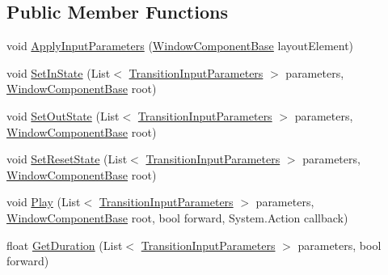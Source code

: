 \subsection*{Public Member Functions}
\begin{DoxyCompactItemize}
\item 
void \hyperlink{class_unity_engine_1_1_u_i_1_1_windows_1_1_animations_1_1_window_animation_base_a5a1b0d698fe0afa0c70ef1b9adcc5501}{Apply\+Input\+Parameters} (\hyperlink{class_unity_engine_1_1_u_i_1_1_windows_1_1_window_component_base}{Window\+Component\+Base} layout\+Element)
\item 
void \hyperlink{class_unity_engine_1_1_u_i_1_1_windows_1_1_animations_1_1_window_animation_base_ad9f07ee171d3b7f3b4be453d116838c6}{Set\+In\+State} (List$<$ \hyperlink{class_unity_engine_1_1_u_i_1_1_windows_1_1_animations_1_1_transition_input_parameters}{Transition\+Input\+Parameters} $>$ parameters, \hyperlink{class_unity_engine_1_1_u_i_1_1_windows_1_1_window_component_base}{Window\+Component\+Base} root)
\item 
void \hyperlink{class_unity_engine_1_1_u_i_1_1_windows_1_1_animations_1_1_window_animation_base_aed8b6bf9e2f261406fd0824f8d654ea7}{Set\+Out\+State} (List$<$ \hyperlink{class_unity_engine_1_1_u_i_1_1_windows_1_1_animations_1_1_transition_input_parameters}{Transition\+Input\+Parameters} $>$ parameters, \hyperlink{class_unity_engine_1_1_u_i_1_1_windows_1_1_window_component_base}{Window\+Component\+Base} root)
\item 
void \hyperlink{class_unity_engine_1_1_u_i_1_1_windows_1_1_animations_1_1_window_animation_base_a49f245bfea7fcdcbaa87a91c2896028b}{Set\+Reset\+State} (List$<$ \hyperlink{class_unity_engine_1_1_u_i_1_1_windows_1_1_animations_1_1_transition_input_parameters}{Transition\+Input\+Parameters} $>$ parameters, \hyperlink{class_unity_engine_1_1_u_i_1_1_windows_1_1_window_component_base}{Window\+Component\+Base} root)
\item 
void \hyperlink{class_unity_engine_1_1_u_i_1_1_windows_1_1_animations_1_1_window_animation_base_a3fd3fe55e978008cecf5056a118389d7}{Play} (List$<$ \hyperlink{class_unity_engine_1_1_u_i_1_1_windows_1_1_animations_1_1_transition_input_parameters}{Transition\+Input\+Parameters} $>$ parameters, \hyperlink{class_unity_engine_1_1_u_i_1_1_windows_1_1_window_component_base}{Window\+Component\+Base} root, bool forward, System.\+Action callback)
\item 
float \hyperlink{class_unity_engine_1_1_u_i_1_1_windows_1_1_animations_1_1_window_animation_base_aff9a96b0e71842da0e0a9fa07c27209d}{Get\+Duration} (List$<$ \hyperlink{class_unity_engine_1_1_u_i_1_1_windows_1_1_animations_1_1_transition_input_parameters}{Transition\+Input\+Parameters} $>$ parameters, bool forward)
\end{DoxyCompactItemize}
